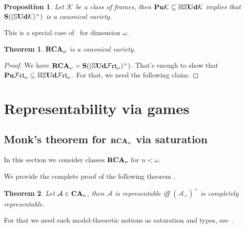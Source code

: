 \documentclass{article}
\theoremstyle{defin}
\theoremstyle{theorem}
\newtheorem{theorem}{Theorem}
\theoremstyle{claim}
\theoremstyle{prop}
\newtheorem{prop}{Proposition}
\theoremstyle{lemma}
\theoremstyle{fact}
\theoremstyle{remark}
\theoremstyle{ex}
\theoremstyle{col}
\theoremstyle{question}
\begin{document}
\begin{prop}
Let $\mathcal{K}$ be a class of frames, then ${\bf Pu}\mathcal{K} \subseteq \mathbb{H}\mathbb{S}{\bf Ud} \mathcal{K}$ implies that ${\bf S}((\mathbb{S}{\bf Ud} \mathcal{K})^+)$ is a canonical variety.
\end{prop}

This is a special case of~\cite[Theorem 4.4]{goldblatt1995elementary} for dimension $\omega$.

\begin{theorem}
${\bf RCA}_{\omega}$ is a canonical variety.
\end{theorem}

\begin{proof}
We have ${\bf RCA}_{\omega} = {\bf S}((\mathbb{S} {\bf Ud} \mathcal{F}\mathfrak{ct}_{\omega})^+)$.
That's enough to show that ${\bf Pu} \mathcal{F}\mathfrak{ct}_{\omega} \subseteq \mathbb{HS} {\bf Ud} \mathcal{F}\mathfrak{ct}_{\omega}$.
For that, we need the following claim:

\end{proof}

\section{Representability via games}

\subsection{Monk's theorem for ${\bf RCA}_n$ via saturation}

In this section we consider classes ${\bf RCA}_n$ for $n < \omega$.

We provide the complete proof of the following theorem \cite[Theorem 3.4.3]{hirsch2013completions}.
\begin{theorem}\label{finitecanon}
Let $\mathcal{A} \in {\bf CA}_n$, then $\mathcal{A}$ is representable iff ${(\mathcal{A}_+)}^{+}$ is completely representable.
\end{theorem}

For that we need such model-theoretic notions as saturation and types, see~\cite[Section 6.3]{hodges1993model}.
\end{document}
